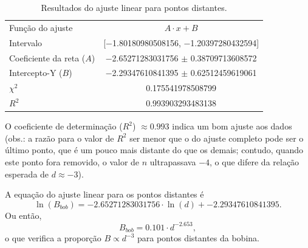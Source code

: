 \documentclass[12pt, a4paper]{article}
\begin{document}
    \begin{table}[h]
        \centering
        \caption{Resultados do ajuste linear para pontos distantes.}
        \label{tab:ajuste_completo}
        \begin{tabular}{lc}
        \toprule
        Função do ajuste & $A \cdot x + B$ \\
        Intervalo & [\num{-1.80180980508156}, \num{-1.20397280432594}] \\
        Coeficiente da reta ($A$) & \num{-2.65271283031756} $\pm$ \num{0.38709713608572} \\
        Intercepto-Y ($B$) & \num{-2.29347610841395} $\pm$ \num{0.62512459619061} \\
        $\chi^2$ & \num{0.175541978508799} \\
        $R^2$ & \num{0.993903293483138} \\
        \bottomrule
        \end{tabular}
        \smallskip
        \begin{tablenotes}
            \item[a] O coeficiente de determinação ($R^2$) $\approx0.993$ indica um bom ajuste aos dados (obs.: a razão para o valor de $R^2$ ser menor que o do ajuste completo pode ser o último ponto, que é um pouco mais distante do que os demais; contudo, quando este ponto fora removido, o valor de $n$ ultrapassava $-4$, o que difere da relação esperada de $d\approx-3$).
        \end{tablenotes}
    \end{table}

    A equação do ajuste linear para os pontos distantes é \[\ln(B_{bob}) = \num{-2.65271283031756} \cdot \ln(d) + \num{-2.29347610841395}.\] Ou então, \[B_{bob} = \num{0.101} \cdot d^{-2.653},\] o que verifica a proporção \(B \propto d^{-3}\) para pontos distantes da bobina.
\end{document}
